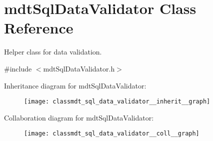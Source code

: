 \hypertarget{classmdt_sql_data_validator}{\section{mdt\-Sql\-Data\-Validator Class Reference}
\label{classmdt_sql_data_validator}
}


Helper class for data validation.  




{\ttfamily \#include $<$mdt\-Sql\-Data\-Validator.\-h$>$}



Inheritance diagram for mdt\-Sql\-Data\-Validator\-:\nopagebreak
\begin{figure}[H]
\begin{center}
\leavevmode
\texttt{[image: classmdt\_sql\_data\_validator\_\_inherit\_\_graph]}
\end{center}
\end{figure}


Collaboration diagram for mdt\-Sql\-Data\-Validator\-:\nopagebreak
\begin{figure}[H]
\begin{center}
\leavevmode
\texttt{[image: classmdt\_sql\_data\_validator\_\_coll\_\_graph]}
\end{center}
\end{figure}

